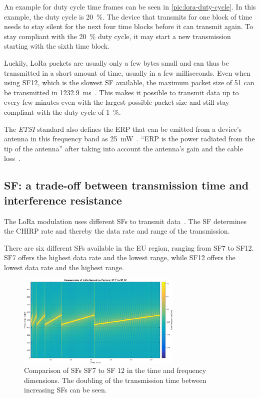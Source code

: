 An example for duty cycle time frames can be seen in \cref{pic:lora-duty-cycle}.
In this example, the duty cycle is \SI{20}{\percent}.
The device that transmits for one block of time needs to stay silent for the next four time blocks before it can transmit again.
To stay compliant with the \SI{20}{\percent} duty cycle, it may start a new transmission starting with the sixth time block.

Luckily, LoRa packets are usually only a few bytes small and can thus be transmitted in a short amount of time, usually in a few milliseconds.
Even when using \acs{SF}12, which is the slowest \acs{SF} available, the maximum packet size of \SI{51}{\byte} can be transmitted in  \SI{1232.9}{\milli\second}~\cite[p. 6]{the_things_network_lorawan_nodate}\cite[p. 10f]{lora_alliance_inc_lorawan_regional_2017}.
This makes it possible to transmit data up to every few minutes even with the largest possible packet size and still stay compliant with the duty cycle of \SI{1}{\percent}.

The \emph{ETSI} standard also defines the \acf{ERP} that can be emitted from a device's antenna in this frequency band as \SI{25}{\milli\watt}~\cite[p. 29]{etsi_etsi_2012}.
``\ac{ERP} is the power radiated from the tip of the antenna'' after taking into account the antenna's gain and the cable loss~\cite[p. 23]{faruque_radio_2015}.

\subsection{\acl{SF}: a trade-off between transmission time and interference resistance}\label{sec:spreading-factors}

The \ac{LoRa} modulation uses different \aclp{SF} to transmit data~\cite{the_things_network_spreading_2023}.
The \acl{SF} determines the \ac{CHIRP} rate and thereby the data rate and range of the transmission.

There are six different \aclp{SF} available in the \ac{EU} region, ranging from \ac{SF}7 to \ac{SF}12.
\ac{SF}7 offers the highest data rate and the lowest range, while \ac{SF}12 offers the lowest data rate and the highest range.

\begin{figure}[htbp]
    \centering
    \includegraphics[width=0.7\textwidth]{pictures/lora/SF_Comparison_7_12.png}
    \caption{
        Comparison of \aclp{SF} \ac{SF}7 to \ac{SF} 12 in the time and frequency dimensions.
        The doubling of the transmission time between increasing \aclp{SF} can be seen.\protect\cite{sakshama_ghoslya_lora_2017}
    }\label{pic:lora-sf-comparison}
\end{figure}


